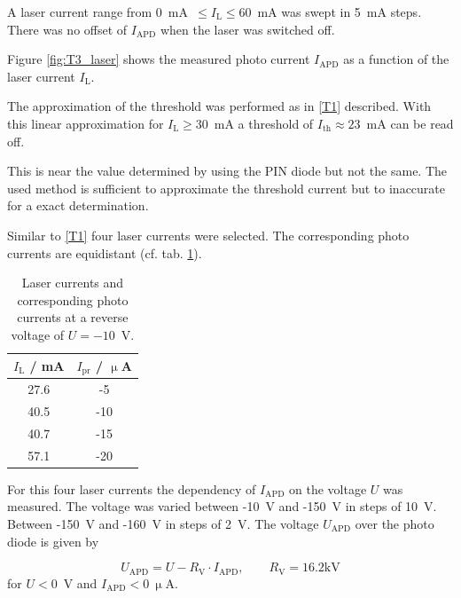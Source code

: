 A laser current range from 0~mA~$\leq I_{\mathrm{L}} \leq 60$~mA was swept in 5~mA steps. There was no offset of $I_{\mathrm{APD}}$ when the laser was switched off. 

Figure \ref{fig:T3_laser} shows the measured photo current $I_{\mathrm{APD}}$ as a function of the laser current $I_{\mathrm{L}}$. 

The approximation of the threshold was performed as in \ref{T1} described.
With this linear approximation for $I_{\mathrm{L}} \geq 30$~mA a threshold of $I_{\mathrm{th}} \approx 23$~mA can be read off.

This is near the value determined by using the PIN diode but not the same. The used method is sufficient to approximate the threshold current but to inaccurate for a exact determination.   



Similar to \ref{T1} four laser currents were selected. The corresponding photo currents are equidistant (cf. tab. \ref{tab:T3_values}).

\begin{table}%
\centering
\caption{Laser currents and corresponding photo currents at a reverse voltage of $U = -10$~V.}


\begin{tabular}{cc}

\toprule
$I_{\mathrm{L}}$ / mA	&	$I_{\mathrm{pr}}$ / $\upmu$A\\

\midrule
27.6 & -5\\
40.5 & -10\\
40.7 & -15\\
57.1 & -20\\

\bottomrule 
\end{tabular}
\label{tab:T3_values}
\end{table}

For this four laser currents the dependency of $I_{\mathrm{APD}}$ on the voltage $U$ was measured. The voltage was varied between -10~V and -150~V in steps of 10~V. Between -150~V and -160~V in steps of 2~V. The voltage $U_{\mathrm{APD}}$ over the photo diode is given by 

\begin{equation}
U_{\mathrm{APD}} = U - R_{\mathrm{V}}\cdot I_{\mathrm{APD}}, \qquad  R_{\mathrm{V}} = 16.2 \mathrm{kV}
\label{eq:}
\end{equation}
for $U < 0$~V and $I_{\mathrm{APD}} < 0~\upmu$A.

